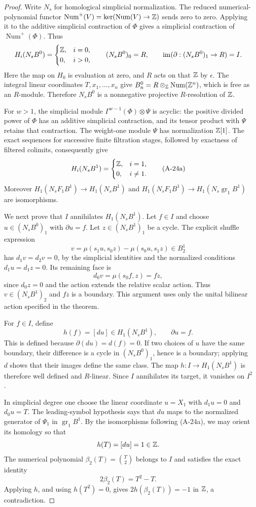 \begin{proof}
Write $N_s$ for homological simplicial normalization. The reduced
numerical-polynomial functor
$\operatorname{Num}^+(V)=\ker(\operatorname{Num}(V)\to\mathbb Z)$
sends zero to zero. Applying it to the additive simplicial
contraction of $\Phi$ gives a simplicial contraction of
$\operatorname{Num}^+(\Phi)$. Thus
\[
 H_i(N_sB^0)=
 \begin{cases}\mathbb Z,&i=0,\\0,&i>0,\end{cases}
 \qquad (N_sB^0)_0=R,
 \qquad \operatorname{im}(\partial:(N_sB^0)_1\to R)=I.
\]
Here the map on $H_0$ is evaluation at zero, and $R$ acts on that
$\mathbb Z$ by $\epsilon$. The integral linear coordinates
$T,x_1,\ldots,x_n$ give
$B_n^0=R\otimes_{\mathbb Z}\operatorname{Num}(\mathbb Z^n)$, which is free
as an $R$-module. Therefore $N_sB^0$ is a nonnegative projective
$R$-resolution of $\mathbb Z$.

For $w>1$, the simplicial module
$\Gamma^{w-1}(\Phi)\otimes\Psi$ is acyclic: the positive divided
power of $\Phi$ has an additive simplicial contraction, and its
tensor product with $\Psi$ retains that contraction. The weight-one
module $\Psi$ has normalization $\mathbb Z[1]$. The exact sequences for
successive finite filtration stages, followed by exactness of
filtered colimits, consequently give
\[
 H_i(N_sB^1)=
 \begin{cases}\mathbb Z,&i=1,\\0,&i\ne1.\end{cases}
 \tag{A-24a}
\]
Moreover $H_1(N_sF_1B^1)\to H_1(N_sB^1)$ and
$H_1(N_sF_1B^1)\to H_1(N_s\operatorname{gr}_1B^1)$ are
isomorphisms.

We next prove that $I$ annihilates $H_1(N_sB^1)$.
Let $f\in I$ and choose $u\in(N_sB^0)_1$ with $\partial u=f$.
Let $z\in(N_sB^1)_1$ be a cycle. The explicit shuffle expression
\[
 v=\mu(s_1u,s_0z)-\mu(s_0u,s_1z)\in B_2^1
\]
has $d_1v=d_2v=0$, by the simplicial identities and the normalized
conditions $d_1u=d_1z=0$. Its remaining face is
\[
 d_0v=\mu(s_0f,z)=fz,
\]
since $d_0z=0$ and the action extends the relative scalar action.
Thus $v\in(N_sB^1)_2$ and $fz$ is a boundary. This argument uses
only the unital bilinear action specified in the theorem.

For $f\in I$, define
\[
 h(f)=[du]\in H_1(N_sB^1),\qquad \partial u=f.
 \tag{A-24b}
\]
This is defined because $\partial(du)=d(f)=0$. If two choices of
$u$ have the same boundary, their difference is a cycle in
$(N_sB^0)_1$, hence is a boundary; applying $d$ shows that their
images define the same class. The map $h:I\to H_1(N_sB^1)$ is
therefore well defined and $R$-linear. Since $I$ annihilates its
target, it vanishes on $I^2$.

In simplicial degree one choose the linear coordinate $u=X_1$
with $d_1u=0$ and $d_0u=T$. The leading-symbol hypothesis says that
$du$ maps to the normalized generator of $\Psi_1$ in
$\operatorname{gr}_1B^1$. By the isomorphisms following (A-24a),
we may orient its homology so that
\[
 h(T)=[du]=1\in\mathbb Z.
\]
The numerical polynomial $\beta_2(T)=\binom T2$ belongs to $I$
and satisfies the exact identity
\[
 2\beta_2(T)=T^2-T.
\]
Applying $h$, and using $h(T^2)=0$, gives
$2h(\beta_2(T))=-1$ in $\mathbb Z$, a contradiction.
\end{proof}

